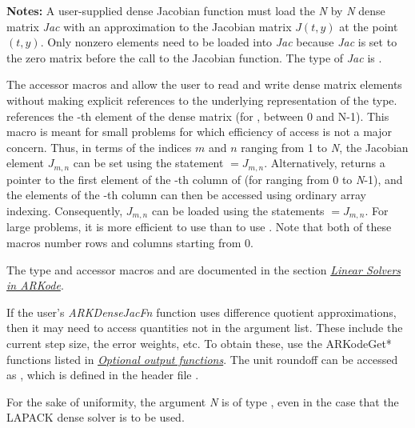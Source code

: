 \documentclass[letterpaper,10pt,english]{sphinxmanual}
\begin{document}
\begin{fulllineitems}
\textbf{Notes:} A user-supplied dense Jacobian function must load the
\emph{N} by \emph{N} dense matrix \emph{Jac} with an approximation to the Jacobian
matrix $J(t,y)$ at the point $(t,y)$. Only nonzero
elements need to be loaded into \emph{Jac} because \emph{Jac} is set to
the zero matrix before the call to the Jacobian function. The type
of \emph{Jac} is .

The accessor macros  and  allow the user
to read and write dense matrix elements without making explicit
references to the underlying representation of the 
type.  references the -th element of
the dense matrix  (for ,  between 0 and
N-1). This macro is meant for small problems for which
efficiency of access is not a major concern. Thus, in terms of the
indices $m$ and $n$ ranging from 1 to \emph{N}, the
Jacobian element $J_{m,n}$ can be set using the statement
 $= J_{m,n}$. Alternatively,
 returns a pointer to the first element of the
-th column of  (for  ranging from 0 to \emph{N}-1),
and the elements of the -th column can then be accessed using
ordinary array indexing. Consequently, $J_{m,n}$ can be
loaded using the statements  $= J_{m,n}$. For large problems, it is more
efficient to use  than to use . Note
that both of these macros number rows and columns starting from 0.

The  type and accessor macros  and
 are documented in the section {\hyperref[linear_solvers/index:linearsolvers]{\emph{Linear Solvers in ARKode}}}.

If the user's \emph{ARKDenseJacFn} function uses difference quotient
approximations, then it may need to access quantities not in the
argument list. These include the current step size, the error
weights, etc.  To obtain these, use the ARKodeGet* functions
listed in {\hyperref[c_interface/User_callable:cinterface-optionaloutputs]{\emph{Optional output functions}}}. The unit roundoff
can be accessed as , which is defined in the
header file .

For the sake of uniformity, the argument \emph{N} is of type ,
even in the case that the LAPACK dense solver is to be used.

\end{fulllineitems}
\end{document}
